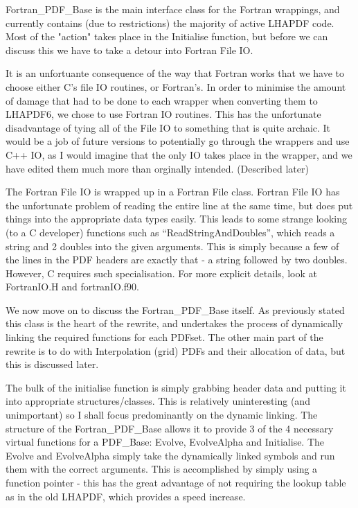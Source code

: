 Fortran\_PDF\_Base is the main interface class for the Fortran wrappings,
and currently contains (due to restrictions) the majority of active LHAPDF
code. Most of the "action" takes place in the Initialise function, but
before we can discuss this we have to take a detour into Fortran File IO.

It is an unfortuante consequence of the way that Fortran works that we have
to choose either C's file IO routines, or Fortran's. In order to minimise
the amount of damage that had to be done to each wrapper when converting
them to LHAPDF6, we chose to use Fortran IO routines. This has the
unfortunate disadvantage of tying all of the File IO to something that is
quite archaic. It would be a job of future versions to potentially go
through the wrappers and use C++ IO, as I would imagine that the only IO
takes place in the wrapper, and we have edited them much more than
orginally intended. (Described later)

The Fortran File IO is wrapped up in a Fortran File class. Fortran File IO
has the unfortunate problem of reading the entire line at the same time,
but does put things into the appropriate data types easily. This leads to
some strange looking (to a C developer) functions such as 
``ReadStringAndDoubles'', which reads a string and 2 doubles into the given
arguments. This is simply because a few of the lines in the PDF headers are
exactly that - a string followed by two doubles. However, C requires such
specialisation. For more explicit details, look at FortranIO.H and
fortranIO.f90.

We now move on to discuss the Fortran\_PDF\_Base itself. As previously
stated this class is the heart of the rewrite, and undertakes the process
of dynamically linking the required functions for each PDFset. The other
main part of the rewrite is to do with Interpolation (grid) PDFs and their
allocation of data, but this is discussed later.

The bulk of the initialise function is simply grabbing header data and
putting it into appropriate structures/classes. This is relatively
uninteresting (and unimportant) so I shall focus predominantly on the
dynamic linking. The structure of the Fortran\_PDF\_Base allows it to 
provide 3 of the 4 necessary virtual functions for a PDF\_Base: Evolve,
EvolveAlpha and Initialise. The Evolve and EvolveAlpha simply take the
dynamically linked symbols and run them with the correct arguments. This is
accomplished by simply using a function pointer - this has the great
advantage of not requiring the lookup table as in the old LHAPDF, which
provides a speed increase.

